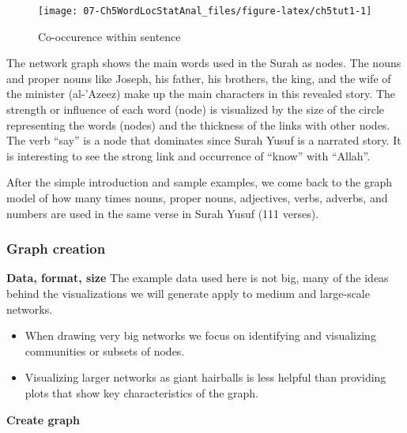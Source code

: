 \documentclass[
]{article}
\providecommand{\tightlist}{%
  \setlength{\itemsep}{0pt}\setlength{\parskip}{0pt}}
\begin{document}
\begin{figure}

{\centering \texttt{[image: 07-Ch5WordLocStatAnal\_files/figure-latex/ch5tut1-1]} 

}

\caption{Co-occurence within sentence}\label{fig:ch5tut1}
\end{figure}

The network graph shows the main words used in the Surah as nodes. The nouns and proper nouns like Joseph, his father, his brothers, the king, and the wife of the minister (al-'Azeez) make up the main characters in this revealed story. The strength or influence of each word (node) is visualized by the size of the circle representing the words (nodes) and the thickness of the links with other nodes. The verb ``say'' is a node that dominates since Surah Yusuf is a narrated story. It is interesting to see the strong link and occurrence of ``know'' with ``Allah''.

After the simple introduction and sample examples, we come back to the graph model of how many times nouns, proper nouns, adjectives, verbs, adverbs, and numbers are used in the same verse in Surah Yusuf (111 verses).

\hypertarget{graph-creation}{%
\subsubsection{Graph creation}\label{graph-creation}}

\textbf{Data, format, size}
The example data used here is not big, many of the ideas behind the visualizations we will generate apply to medium and large-scale networks.

\begin{itemize}
\tightlist
\item
  When drawing very big networks we focus on identifying and visualizing communities or subsets of nodes.
\item
  Visualizing larger networks as giant hairballs is less helpful than providing plots that show key characteristics of the graph.
\end{itemize}

\textbf{Create graph}
\end{document}
